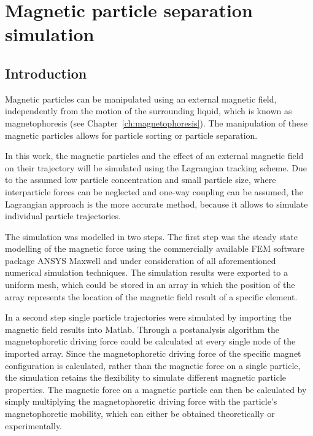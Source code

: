 \chapter{Magnetic particle separation simulation}\label{ch:magneticParticleSeparationSimulation}


\section{Introduction}
Magnetic particles can be manipulated using an external magnetic field, independently from the motion of the surrounding liquid, which is known as magnetophoresis (see Chapter~\ref{ch:magnetophoresis}). The manipulation of these magnetic particles allows for particle sorting or particle separation. 

In this work, the magnetic particles and the effect of an external magnetic field on their trajectory will be simulated using the Lagrangian tracking scheme. Due to the assumed low particle concentration and small particle size, where interparticle forces can be neglected and one-way coupling can be assumed, the Lagrangian approach is the more accurate method, because it allows to simulate individual particle trajectories. 

The simulation was modelled in two steps. The first step was the steady state modelling of the magnetic force using the commercially available FEM software package ANSYS Maxwell and under consideration of all aforementioned numerical simulation techniques. The simulation results were exported to a uniform mesh, which could be stored in an array in which the position of the array represents the location of the magnetic field result of a specific element. 

In a second step single particle trajectories were simulated by importing the magnetic field results into Matlab. Through a postanalysis algorithm the magnetophoretic driving force could be calculated at every single node of the imported array. Since the magnetophoretic driving force of the specific magnet configuration is calculated, rather than the magnetic force on a single particle, the simulation retains the flexibility to simulate different magnetic particle properties. The magnetic force on a magnetic particle can then be calculated by simply multiplying the magnetophoretic driving force with the particle's magnetophoretic mobility, which can either be obtained theoretically or experimentally. 

